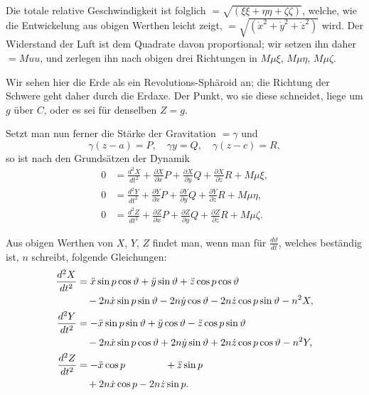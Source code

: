 \documentclass[12pt,a4paper]{article}
\begin{document}
Die totale relative Geschwindigkeit ist folglich $= \sqrt{(\xi\xi + \eta\eta + \zeta\zeta)}$, welche, 
wie die Entwickelung aus obigen Werthen leicht zeigt, $= \sqrt{(\dot{x}^2 + \dot{y}^2 + \dot{z}^2)}$ 
wird. Der Widerstand der Luft ist dem Quadrate davon proportional; wir 
setzen ihn daher $= Muu$, und zerlegen ihn nach obigen drei Richtungen in 
$M\mu\xi$, $M\mu\eta$, $M\mu\zeta$.

Wir sehen hier die Erde als ein Revolutions-Sphäroid an; die Richtung der 
Schwere geht daher durch die Erdaxe. Der Punkt, wo sie diese schneidet, liege 
um $g$ über $C$, oder es sei für denselben $Z = g$.

Setzt man nun ferner die Stärke der Gravitation $= \gamma$ und
\[
\gamma(z-a) = P,\quad \gamma y = Q,\quad \gamma(z-c) = R,
\]
so ist nach den Grundsätzen der Dynamik
\begin{align}
0 &= \frac{d^2X}{dt^2} + \tfrac{\partial X}{\partial x}P + \tfrac{\partial X}{\partial y}Q + \tfrac{\partial X}{\partial z}R + M\mu\xi,\\
0 &= \frac{d^2Y}{dt^2} + \tfrac{\partial Y}{\partial x}P + \tfrac{\partial Y}{\partial y}Q + \tfrac{\partial Y}{\partial z}R + M\mu\eta,\\
0 &= \frac{d^2Z}{dt^2} + \tfrac{\partial Z}{\partial x}P + \tfrac{\partial Z}{\partial y}Q + \tfrac{\partial Z}{\partial z}R + M\mu\zeta.
\end{align}

Aus obigen Werthen von $X$, $Y$, $Z$ findet man, wenn man für 
$\tfrac{d\vartheta}{dt}$, welches beständig ist, $n$ schreibt, folgende Gleichungen:
\begin{align}
\frac{d^2X}{dt^2} &= \ddot{x}\sin p\cos\vartheta + \ddot{y}\sin\vartheta + \ddot{z}\cos p\cos\vartheta \notag\\
&\quad - 2n\dot{x}\sin p\sin\vartheta - 2n\dot{y}\cos\vartheta - 2n\dot{z}\cos p\sin\vartheta - n^2X,\\
\frac{d^2Y}{dt^2} &= -\ddot{x}\sin p\sin\vartheta + \ddot{y}\cos\vartheta - \ddot{z}\cos p\sin\vartheta \notag\\
&\quad - 2n\dot{x}\sin p\cos\vartheta + 2n\dot{y}\sin\vartheta + 2n\dot{z}\cos p\cos\vartheta - n^2Y,\\
\frac{d^2Z}{dt^2} &= -\ddot{x}\cos p \qquad\qquad + \ddot{z}\sin p \notag\\
&\quad + 2n\dot{x}\cos p - 2n\dot{z}\sin p.
\end{align}
\end{document}
